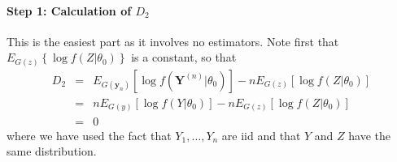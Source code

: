 \documentclass[12pt]{article}
\theoremstyle{definition}
\begin{document}
\paragraph{Step 1: Calculation of $D_2$} This is the easiest part as it involves no estimators. Note first that $E_{G(z)}\left\{  \log{f\left(\left.Z\right|\theta_0\right)}\right\} $ is a constant, so that
	\begin{eqnarray*}
		D_2 &=& E_{G(\mathbf{y}_n)}\left[  \log{f\left( \mathbf{Y}^{(n)}|\theta_0 \right)}\right] - nE_{G(z)}\left[  \log{f\left(\left.Z\right|\theta_0\right)}\right] \\
		&=& n E_{G(y)}\left[ \log{f(Y|\theta_0)} \right] -  nE_{G(z)}\left[  \log{f\left(\left.Z\right|\theta_0\right)}\right] \\
		&=& 0
	\end{eqnarray*}
where we have used the fact that $Y_1, \hdots, Y_n$ are iid and that $Y$ and $Z$ have the same distribution. 
\end{document}
